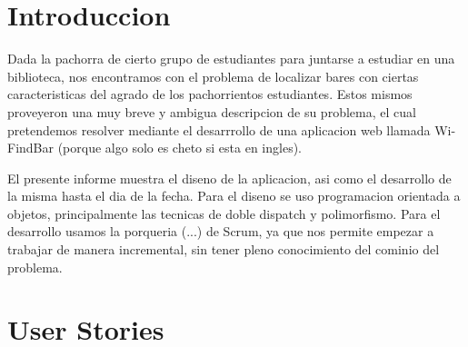\documentclass[10pt,a4paper]{article}
\begin{document}
\begin{comment}
\hline \hline
\multirow{3}{2cm}{Registrarme} & Crear entorno de programacion & 2 & \\ \cline{2-4}
& Verificar datos y agregarlos a la base de datos & 5 & \\ \cline{2-4}
& Crear interfaz grafica & 2 & 9\\ \cline{1-4}
\hline \hline
\multirow{3}{2cm}{Loguearme} & Crear entorno de programacion & 2 & \\ \cline{2-4}
& Verificar datos & 1 & \\ \cline{2-4}
& Crear interfaz grafica & 1 & 4\\ \cline{1-4}
\hline \hline
\multirow{3}{2cm}{Eliminar bar} & Crear entorno de programacion & 2 & \\ \cline{2-4}
& Verificar datos del bar& 1 & \\ \cline{2-4}
& Verificar datos del usuario& 1 & \\ \cline{2-4}
& Eliminar datos de la base de datos& 5 & \\ \cline{2-4}
& Crear interfaz grafica & 3 & 13\\ \cline{1-4}

\end{tabular}
\end{center}
\end{table}
\end{comment}

\section{Introduccion}

Dada la pachorra de cierto grupo de estudiantes para juntarse a estudiar en una biblioteca, nos encontramos con el problema de localizar bares con ciertas caracteristicas del 
agrado de los pachorrientos estudiantes. Estos mismos proveyeron una muy breve y ambigua descripcion de su problema, el cual pretendemos resolver mediante el desarrrollo de una 
aplicacion web llamada Wi-FindBar (porque algo solo es cheto si esta en ingles). 

El presente informe muestra el diseno de la aplicacion, asi como el desarrollo de la misma hasta el dia de la fecha. Para el diseno se uso programacion orientada a objetos, 
principalmente las tecnicas de doble dispatch y polimorfismo. Para el desarrollo usamos la porqueria (...) de Scrum, ya que nos permite empezar a trabajar de manera incremental, sin tener
pleno conocimiento del cominio del problema.

\section{User Stories}
\end{document}
